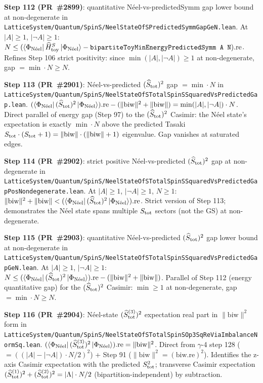 \documentclass[a4paper,11pt]{article}
\begin{document}
\textbf{Step 112 (PR~\#2899)}: quantitative N\'eel-vs-predictedSymm
gap lower bound at non-degenerate in
\texttt{LatticeSystem/Quantum/SpinS/NeelStateOfSPredictedSymmGapGeN.lean}.
At $|A| \ge 1$, $|\neg A| \ge 1$:
$N \le (\langle\Phi_{\rm N\acute{e}el} |\, \widehat H_{\rm toy}^S\,
   | \Phi_{\rm N\acute{e}el}\rangle
   - \texttt{bipartiteToyMinEnergyPredictedSymm A N}).\mathrm{re}$.
Refines Step 106 strict positivity: since $\min(|A|, |\neg A|) \ge 1$
at non-degenerate, gap $= \min\cdot N \ge N$.

\textbf{Step 113 (PR~\#2901)}: N\'eel-vs-predicted $(\widehat S_{\rm tot})^2$
gap $= \min\cdot N$ in
\texttt{LatticeSystem/Quantum/SpinS/NeelStateOfSTotalSpinSSquaredVsPredictedGap.lean}.
$(\langle\Phi_{\rm N\acute{e}el} |\,(\widehat S_{\rm tot})^2\,
   | \Phi_{\rm N\acute{e}el}\rangle).\mathrm{re}
   - (\|\mathrm{biw}\|^2 + \|\mathrm{biw}\|)
   = \min(|A|,|\neg A|)\cdot N$.
Direct parallel of energy gap (Step 97) to the $(\widehat S_{\rm tot})^2$
Casimir: the N\'eel state's expectation is exactly $\min\cdot N$ above the
predicted Tasaki $S_{\rm tot}\cdot(S_{\rm tot}+1) =
\|\mathrm{biw}\|\cdot(\|\mathrm{biw}\|+1)$ eigenvalue. Gap vanishes at
saturated edges.

\textbf{Step 114 (PR~\#2902)}: strict positive N\'eel-vs-predicted
$(\widehat S_{\rm tot})^2$ gap at non-degenerate in
\texttt{LatticeSystem/Quantum/SpinS/NeelStateOfSTotalSpinSSquaredVsPredictedGapPosNondegenerate.lean}.
At $|A| \ge 1$, $|\neg A| \ge 1$, $N \ge 1$:
$\|\mathrm{biw}\|^2 + \|\mathrm{biw}\| <
   (\langle\Phi_{\rm N\acute{e}el} |\,(\widehat S_{\rm tot})^2\,
   | \Phi_{\rm N\acute{e}el}\rangle).\mathrm{re}$.
Strict version of Step 113; demonstrates the N\'eel state spans multiple
$S_{\rm tot}$ sectors (not the GS) at non-degenerate.

\textbf{Step 115 (PR~\#2903)}: quantitative N\'eel-vs-predicted
$(\widehat S_{\rm tot})^2$ gap lower bound at non-degenerate in
\texttt{LatticeSystem/Quantum/SpinS/NeelStateOfSTotalSpinSSquaredVsPredictedGapGeN.lean}.
At $|A| \ge 1$, $|\neg A| \ge 1$:
$N \le (\langle\Phi_{\rm N\acute{e}el} |\,(\widehat S_{\rm tot})^2\,
   | \Phi_{\rm N\acute{e}el}\rangle).\mathrm{re}
   - (\|\mathrm{biw}\|^2 + \|\mathrm{biw}\|)$.
Parallel of Step 112 (energy quantitative gap) for the
$(\widehat S_{\rm tot})^2$ Casimir: $\min \ge 1$ at non-degenerate,
gap $= \min\cdot N \ge N$.

\textbf{Step 116 (PR~\#2904)}: N\'eel-state $(\widehat S_{\rm tot}^{(3)})^2$
expectation real part in $\|\mathrm{biw}\|^2$ form in
\texttt{LatticeSystem/Quantum/SpinS/NeelStateOfSTotalSpinSOp3SqReViaImbalanceNormSq.lean}.
$(\langle\Phi_{\rm N\acute{e}el} |\,(\widehat S_{\rm tot}^{(3)})^2\,
   | \Phi_{\rm N\acute{e}el}\rangle).\mathrm{re} = \|\mathrm{biw}\|^2$.
Direct from $\gamma$-4 step 128 ($= ((|A|-|\neg A|)\cdot N/2)^2$) +
Step 91 ($\|\mathrm{biw}\|^2 = (\mathrm{biw.re})^2$). Identifies the
z-axis Casimir expectation with the predicted $S_{\rm tot}^2$;
transverse Casimir expectation
$(\widehat S_{\rm tot}^{(1)})^2 + (\widehat S_{\rm tot}^{(2)})^2 =
|\Lambda|\cdot N/2$ (bipartition-independent) by subtraction.
\end{document}
